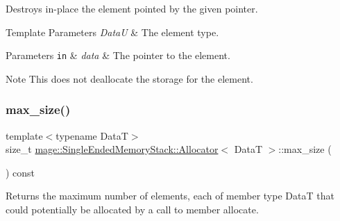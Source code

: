 Destroys in-\/place the element pointed by the given pointer.


\begin{DoxyTemplParams}{Template Parameters}
{\em DataU} & The element type. \\
\hline
\end{DoxyTemplParams}

\begin{DoxyParams}[1]{Parameters}
\mbox{\tt in}  & {\em data} & The pointer to the element. \\
\hline
\end{DoxyParams}
\begin{DoxyNote}{Note}
This does not deallocate the storage for the element. 
\end{DoxyNote}
\hypertarget{structmage_1_1_single_ended_memory_stack_1_1_allocator_a9b000beaef4ac49b2019e6aac93d91f0}{}\label{structmage_1_1_single_ended_memory_stack_1_1_allocator_a9b000beaef4ac49b2019e6aac93d91f0} 
\subsubsection{\texorpdfstring{max\+\_\+size()}{max\_size()}}
{\footnotesize\ttfamily template$<$typename DataT$>$ \\
size\+\_\+t \hyperlink{structmage_1_1_single_ended_memory_stack_1_1_allocator}{mage\+::\+Single\+Ended\+Memory\+Stack\+::\+Allocator}$<$ DataT $>$\+::max\+\_\+size (\begin{DoxyParamCaption}{ }\end{DoxyParamCaption}) const\hspace{0.3cm}{\ttfamily [noexcept]}}

Returns the maximum number of elements, each of member type {\ttfamily DataT} that could potentially be allocated by a call to member allocate. \hypertarget{structmage_1_1_single_ended_memory_stack_1_1_allocator_a47f35477a04192175bc0f4ce737595fb}{}\label{structmage_1_1_single_ended_memory_stack_1_1_allocator_a47f35477a04192175bc0f4ce737595fb} 
